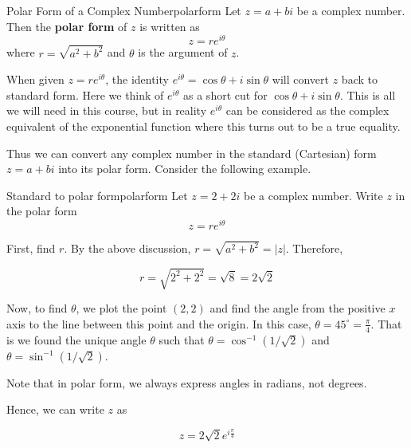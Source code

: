 \begin{definition}{Polar Form of a Complex Number}{polarform}
Let $z = a + bi$ be a complex number. Then the \textbf{polar form} of $z$ is written as 
\[
z = re^{i\theta}
\]
where $r = \sqrt{a^2 + b^2}$ and $\theta$ is the argument of $z$. 
\end{definition}

When given $z = re^{i\theta}$, the identity $e^{i\theta} = \cos\theta + i \sin\theta$ will convert $z$ back to standard form. Here we think of $ e^{i \theta}$ as a short cut for $ \cos \theta
+i\sin \theta$. This is all we will need in this course, but in
reality $e^{i \theta}$ can be considered as the complex equivalent of
the exponential function where this turns out to be a true equality.

\begin{center}
\end{center}

Thus we can convert any complex number in the standard (Cartesian) form $z = a+bi$
into its polar form. Consider the following example.

\begin{example}{Standard to polar form}{polarform}
Let $z = 2 + 2i$ be a complex number. 
Write $z$ in the polar form 
\begin{equation*}
z = re^{i \theta}
\end{equation*}
\end{example}

\begin{solution}
First, find $r$.
By the above discussion, $r=\sqrt{
a^{2}+b^{2}} = |z|$. Therefore,

\begin{equation*}
r = \sqrt{2^{2} + 2^{2}} = \sqrt{8} =2\sqrt{2}
\end{equation*}

Now, to find $\theta$, we plot the point $\left( 2, 2 \right)$ and
find the angle from the positive $x$ axis to the line between this
point and the origin. In this case, $\theta = 45^{\circ} =
\frac{\pi}{4}$.  That is we found the unique angle $\theta$ such that 
$\theta = \cos^{-1}(1/\sqrt{2})$ and $\theta = \sin^{-1}(1/\sqrt{2})$. 

Note that in polar form, we always express angles in radians, not degrees.

Hence, we can write $z$ as

\begin{equation*}
z = 2\sqrt{2} e^{i\frac{\pi}{4}}
\end{equation*}

\end{solution}

